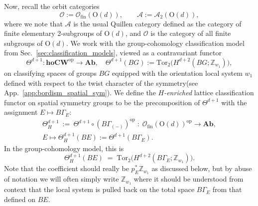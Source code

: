 \documentclass[aps,prx,reprint,superscriptaddress,twocolumn,amsmath,amssymb,amsfonts, nofootinbib]{revtex4-2}
\newcommand{\ofin}{\mathcal{O}_{\text{fin}}}
\newcommand{\tor}{\text{Tor}}
\newcommand{\Z}{\mathbb{Z}}
\theoremstyle{apsstyle}
\begin{document}
\bigskip 

\noindent Now, recall the orbit categories
\begin{equation*}
\mathcal{O}:=\mathcal{O}_{\mathrm{fin}}(\mathrm{O}(d)),
\qquad
\mathcal{A}:=\mathcal{A}_{2}(\mathrm{O}(d)),
\end{equation*}
where we note that $\mathcal{A}$ is the usual Quillen category defined as the category of finite elementary 2-subgroups of $\mathrm{O}(d)$, and $\mathcal{O}$ is the category of all finite subgroups of $\mathrm{O}(d)$. We work with the group-cohomology classification model from Sec.~\ref{sec:classification_models}, viewed as a contravariant functor
\begin{equation*}
\Theta^{d+1}:\mathbf{hoCW}^{\mathrm{op}}\to\mathbf{Ab}, \quad \Theta^{d+1}(BG):=\tor_{2}\big(H^{d+2}(BG;\Z_{w_1})\big),
\end{equation*} 
on classifying spaces of groups $BG$ equipped with the orientation local system $w_{1}$ defined with respect to the twist character of the symmetry(see App.~\ref{app:bordism_spatial_sym}). We define the \emph{$H$-enriched} lattice classification functor on spatial symmetry groups to be the precomposition of $\Theta^{d+1}$ with the assignment $E\mapsto B\Gamma_E$:
\begin{gather}
\label{eq:internal_functor}
\Theta^{d+1}_{H}\ :=\ \Theta^{d+1}\circ (B\Gamma_{(-)})^{\mathrm{op}}
\;:\;\ofin(\mathrm{O}(d))^{\mathrm{op}}\to\mathbf{Ab},\\
E\longmapsto \Theta^{d+1}_{H}(BE):=\Theta^{d+1}(B\Gamma_E).\nonumber 
\end{gather}
In the group-cohomology model, this is
\begin{equation*}
\Theta^{d+1}_{H}(BE) \;=\; \tor_{2}\big(H^{d+2}(B\Gamma_E;\Z_{w_1})\big).
\end{equation*}
Note that the coefficient should really be $p_{E}^{*}\Z_{w_{1}}$ as discussed below, but by abuse of notation we will often simply write $\Z_{w_{1}}$ where it should be understood from context that the local system is pulled back on the total space $B\Gamma_{E}$ from that defined on $BE$.

\bigskip 
\end{document}
